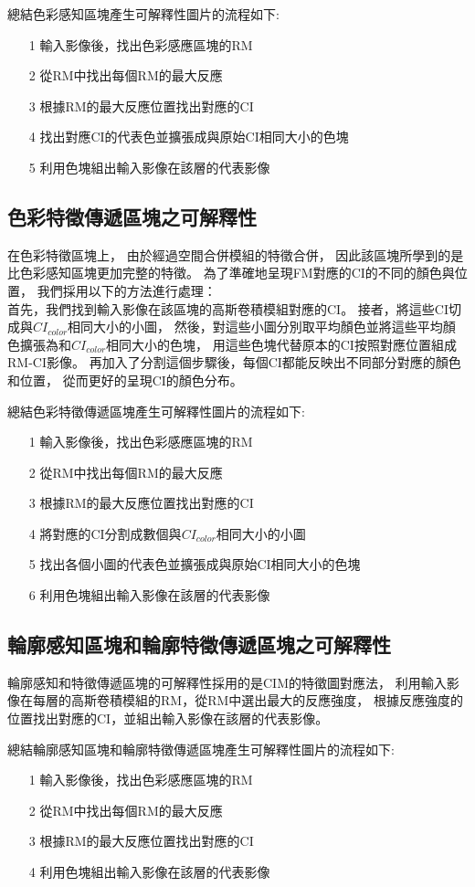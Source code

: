 \documentclass[class=NCU_thesis, crop=false]{standalone}
\begin{document}
	總結色彩感知區塊產生可解釋性圖片的流程如下:
	\begin{itemize}
		\item [1]
		輸入影像後，找出色彩感應區塊的RM
		\item [2]
		從RM中找出每個RM的最大反應
		\item [3]
		根據RM的最大反應位置找出對應的CI
		\item [4]
		找出對應CI的代表色並擴張成與原始CI相同大小的色塊
		\item [5]
		利用色塊組出輸入影像在該層的代表影像
	\end{itemize}

	\subsection{色彩特徵傳遞區塊之可解釋性}
	在色彩特徵區塊上，
	由於經過空間合併模組的特徵合併，
	因此該區塊所學到的是比色彩感知區塊更加完整的特徵。
	為了準確地呈現FM對應的CI的不同的顏色與位置，
	我們採用以下的方法進行處理：\\
	首先，我們找到輸入影像在該區塊的高斯卷積模組對應的CI。
	接者，將這些CI切成與$CI_{color}$相同大小的小圖，
	然後，對這些小圖分別取平均顏色並將這些平均顏色擴張為和$CI_{color}$相同大小的色塊，
	用這些色塊代替原本的CI按照對應位置組成RM-CI影像。
	再加入了分割這個步驟後，每個CI都能反映出不同部分對應的顏色和位置，
	從而更好的呈現CI的顏色分布。

	總結色彩特徵傳遞區塊產生可解釋性圖片的流程如下:
	\begin{itemize}
		\item [1]
		輸入影像後，找出色彩感應區塊的RM
		\item [2]
		從RM中找出每個RM的最大反應
		\item [3]
		根據RM的最大反應位置找出對應的CI
		\item [4]
		將對應的CI分割成數個與$CI_{color}$相同大小的小圖
		\item [5]
		找出各個小圖的代表色並擴張成與原始CI相同大小的色塊
		\item [6]
		利用色塊組出輸入影像在該層的代表影像
	\end{itemize}

	\subsection{輪廓感知區塊和輪廓特徵傳遞區塊之可解釋性}
	輪廓感知和特徵傳遞區塊的可解釋性採用的是CIM的特徵圖對應法，
	利用輸入影像在每層的高斯卷積模組的RM，從RM中選出最大的反應強度，
	根據反應強度的位置找出對應的CI，並組出輸入影像在該層的代表影像。

	總結輪廓感知區塊和輪廓特徵傳遞區塊產生可解釋性圖片的流程如下:
	\begin{itemize}
		\item [1]
		輸入影像後，找出色彩感應區塊的RM
		\item [2]
		從RM中找出每個RM的最大反應
		\item [3]
		根據RM的最大反應位置找出對應的CI
		\item [4]
		利用色塊組出輸入影像在該層的代表影像
	\end{itemize}
\end{document}
